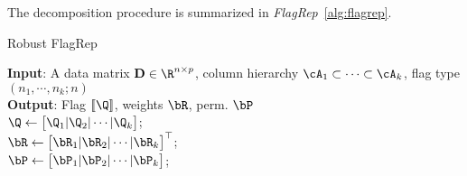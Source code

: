 



The decomposition procedure is summarized in \emph{FlagRep}~\cref{alg:flagrep}. 

\begin{algorithm}[ht!]%
\caption{Robust FlagRep}\label{alg:robust flagrep}
 \textbf{Input}: {A data matrix $\mathbf{D} \in \R^{n \times p}$, column hierarchy $\cA_1\subset \cdots \subset \cA_k$, flag type $(n_1,\cdots,n_k;n)$}\\
 \textbf{Output}: {Flag $[\![\Q]\!]$, weights $\bR$, perm. $\bP$} \\[0.25em]
     $\Q \gets \begin{bmatrix}\Q_1 | \Q_2 | \cdots | \Q_k\end{bmatrix}$;\\
     $\bR \gets \begin{bmatrix}\bR_1 | \bR_2 | \cdots | \bR_k \end{bmatrix}^\top$;\\
     $\bP \gets \begin{bmatrix} \bP_1 | \bP_2 | \cdots | \bP_k \end{bmatrix}$;
\end{algorithm}%